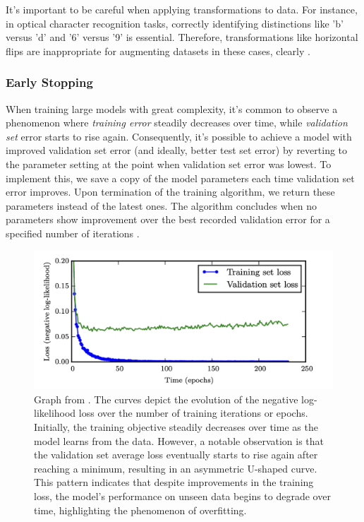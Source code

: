 \documentclass{article}
\begin{document}
It's important to be careful when applying transformations to data. For instance, in optical character recognition tasks, correctly identifying distinctions like 'b' versus 'd' and '6' versus '9' is essential. Therefore, transformations like horizontal flips are inappropriate for augmenting datasets in these cases, clearly \citep{Goodfellow-et-al-2016}. 
\subsubsection{Early Stopping}%
  \label{sub:Early Stopping}
When training large models with great complexity, it's common to observe a phenomenon where \textit{training error} steadily decreases over time, while \textit{validation set} error starts to rise again. Consequently, it's possible to achieve a model with improved validation set error (and ideally, better test set error) by reverting to the parameter setting at the point when validation set error was lowest. To implement this, we save a copy of the model parameters each time validation set error improves. Upon termination of the training algorithm, we return these parameters instead of the latest ones. The algorithm concludes when no parameters show improvement over the best recorded validation error for a specified number of iterations \citep{Goodfellow-et-al-2016}. 
\begin{figure}
\includegraphics{augmentData}
  \caption{Graph from \cite{Goodfellow-et-al-2016}. The curves depict the evolution of the negative log-likelihood loss over the number of training iterations or epochs. Initially, the training objective steadily decreases over time as the model learns from the data. However, a notable observation is that the validation set average loss eventually starts to rise again after reaching a minimum, resulting in an asymmetric U-shaped curve. This pattern indicates that despite improvements in the training loss, the model's performance on unseen data begins to degrade over time, highlighting the phenomenon of overfitting.}
\end{figure}
\end{document}
